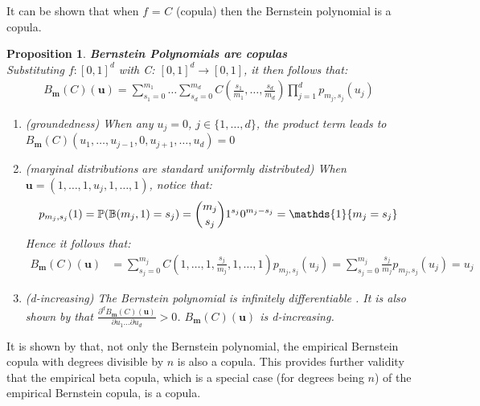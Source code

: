 \documentclass[12pt]{report}
\newtheorem{proposition}{Proposition}[section]
\newcommand{\1}{\mathbf{1}}
\begin{document}
It can be shown that when $f$ = $C$ (copula) then the Bernstein polynomial is a copula.

\begin{proposition}\label{BersteinPolynomialCopula}
\textit{\normalfont\parencite{SegersEBC}}\:
\textbf{Bernstein Polynomials are copulas} \\
Substituting $f: [0,1]^{d}$ with C: $[0,1]^{d} \rightarrow [0,1]$, it then follows that:
\begin{align*}
B_{\boldsymbol{m}}(C)(\boldsymbol{u}) = \sum\limits_{s_{1} = 0}^{m_{1}} \dots \sum\limits_{s_{d} = 0}^{m_{d}} C \left(\frac{s_{1}}{m_{1}}, \dots, \frac{s_{d}}{m_{d}} \right) \prod\limits_{j = 1}^{d} p_{m_{j},s_{j}}(u_{j})
\end{align*}
\begin{enumerate}
\item (groundedness) When any $u_{j} = 0$, $j \in \{1, \dots, d\}$, the product term leads to $B_{\boldsymbol{m}}(C)(u_{1}, \dots, u_{j-1}, 0, u_{j+1}, \dots, u_{d}) = 0$
\item (marginal distributions are standard uniformly distributed) When $\boldsymbol{u} = (1, \dots, 1, u_{j}, 1, \dots, 1)$, notice that:
\begin{align*}
p_{m_{j},s_{j}}(1) = \mathbb{P}(\mathbb{B}(m_{j},1) = s_{j}) = \dbinom{m_{j}}{s_{j}} 1^{s_{j}} 0^{m_{j}-s_{j}} = \mathds{1}\{m_{j} = s_{j}\}
\end{align*}
Hence it follows that:
\begin{align*}
B_{\boldsymbol{m}}(C)(\boldsymbol{u}) &= \sum\limits_{s_{j} = 0}^{m_{j}} C(1, \dots, 1, \frac{s_{j}}{m_{j}}, 1, \dots, 1) p_{m_{j},s_{j}}(u_{j}) = \sum\limits_{s_{j} = 0}^{m_{j}} \frac{s_{j}}{m_{j}} p_{m_{j},s_{j}}(u_{j}) = u_{j}
\end{align*}
\item (d-increasing) The Bernstein polynomial is infinitely differentiable \parencite{SegersEBC}. It is also shown by \cite{SegersEBC} that $\frac{\partial^{d} B_{\boldsymbol{m}}(C)(\boldsymbol{u})}{\partial u_{1} \dots \partial u_{d}} > 0$. $B_{\boldsymbol{m}}(C)(\boldsymbol{u})$ is d-increasing.
\end{enumerate}
\end{proposition}

It is shown by \cite{SegersEBC} that, not only the Bernstein polynomial, the empirical Bernstein copula with degrees divisible by $n$ is also a copula. This provides further validity that the empirical beta copula, which is a special case (for degrees being $n$) of the empirical Bernstein copula, is a copula.
\end{document}
